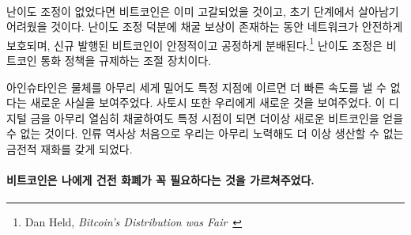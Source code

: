 \paragraph{}
\begin{comment}	
	If it weren't for this difficulty adjustment, all bitcoins would have been mined
	already. If it weren't for this difficulty adjustment, Bitcoin probably wouldn't
	have survived in its infancy. It is what secures the network in its reward era.
	It is what ensures a steady and fair distribution\footnote{Dan Held,
		\textit{Bitcoin's Distribution was Fair}~\cite{distribution-was-fair}} of new
	bitcoin. It is the thermostat which regulates Bitcoin's monetary policy.
\end{comment}
난이도 조정이 없었다면 비트코인은 이미 고갈되었을 것이고, 초기 단계에서 살아남기 어려웠을 것이다.
난이도 조정 덕분에 채굴 보상이 존재하는 동안 네트워크가 안전하게 보호되며,
신규 발행된 비트코인이 안정적이고 공정하게 분배된다.\footnote{Dan Held,
	\textit{Bitcoin’s Distribution was Fair}~\cite{distribution-was-fair}}
난이도 조정은 비트코인 통화 정책을 규제하는 조절 장치이다.

\begin{comment}	
	Einstein showed us something novel: no matter how hard you push an
	object, at a certain point you won't be able to get more speed out of
	it. Satoshi also showed us something novel: no matter how hard you dig
	for this digital gold, at a certain point you won't be able to get more
	bitcoin out of it. For the first time in human history, we have a
	monetary good which, no matter how hard you try, you won't be able to
	produce more of.
\end{comment}
아인슈타인은 물체를 아무리 세게 밀어도 특정 지점에 이르면 더 빠른 속도를 낼 수 없다는 새로운 사실을 보여주었다. 
사토시 또한 우리에게 새로운 것을 보여주었다. 
이 디지털 금을 아무리 열심히 채굴하여도 특정 시점이 되면 더이상 새로운 비트코인을 얻을 수 없는 것이다. 
인류 역사상 처음으로 우리는 아무리 노력해도 더 이상 생산할 수 없는 금전적 재화를 갖게 되었다.

\paragraph{비트코인은 나에게 건전 화폐가 꼭 필요하다는 것을 가르쳐주었다.}

